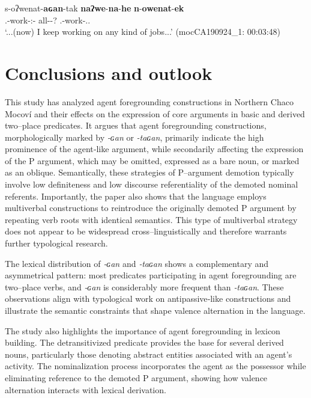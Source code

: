\documentclass[12pt]{article}
\begin{document}
\begin{exe}
\ex 
\gll s-oʔwenat-\textbf{aɢan}-tak  \textbf{naʔwe}-\textbf{na}-\textbf{he} \textbf{n}-\textbf{owenat}-\textbf{ek}   \\
{\First.\II}-work-{\Vm:\Intr}-{\Prog} {all}-{\DetFive}-{?} {\Indet.\Poss}-work-{\Nmlz.\Obj.\Sg}\\
\trans `...(now) I keep working on any kind of jobs...' \hfill(mocCA190924\_1: 00:03:48)\label{ex:p-expression-indef-two}
\end{exe}


\section{Conclusions and outlook}{\label{sec:conclusions}}
This study has analyzed agent foregrounding constructions in Northern Chaco Mocoví and their effects on the expression of core arguments in basic and derived two--place predicates. It argues that agent foregrounding constructions, morphologically marked by \textit{-ɢan} or \textit{-taɢan}, primarily indicate the high prominence of the agent‑like argument, while secondarily affecting the expression of the P argument, which may be omitted, expressed as a bare noun, or marked as an oblique. Semantically, these strategies of P--argument demotion typically involve low definiteness and low discourse referentiality of the demoted nominal referents. Importantly, the paper also shows that the language employs multiverbal constructions to reintroduce the originally demoted P argument by repeating verb roots with identical semantics. This type of multiverbal strategy does not appear to be widespread cross--linguistically and therefore warrants further typological research.

The lexical distribution of \textit{‑ɢan} and \textit{‑taɢan} shows a complementary and asymmetrical pattern: most predicates participating in agent foregrounding are two--place verbs, and \textit{‑ɢan} is considerably more frequent than \textit{‑taɢan}. These observations align with typological work on antipassive‑like constructions and illustrate the semantic constraints that shape valence alternation in the language.

The study also highlights the importance of agent foregrounding in lexicon building. The detransitivized predicate provides the base for several derived nouns, particularly those denoting abstract entities associated with an agent’s activity. The nominalization process incorporates the agent as the possessor while eliminating reference to the demoted P argument, showing how valence alternation interacts with lexical derivation.
\end{document}
